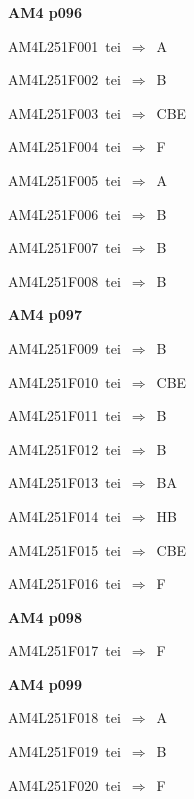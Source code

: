 \par\vfill\eject
{\bf\hfill AM4 p096\hfill\hbox{}}\par\bigskip
{\sixrm AM4L251F001\ {\sixit tei}\ }$\Rightarrow$\ A\par\smallskip
{\sixrm AM4L251F002\ {\sixit tei}\ }$\Rightarrow$\ B\par\smallskip
{\sixrm AM4L251F003\ {\sixit tei}\ }$\Rightarrow$\ CBE\par\smallskip
{\sixrm AM4L251F004\ {\sixit tei}\ }$\Rightarrow$\ F\par\smallskip
{\sixrm AM4L251F005\ {\sixit tei}\ }$\Rightarrow$\ A\par\smallskip
{\sixrm AM4L251F006\ {\sixit tei}\ }$\Rightarrow$\ B\par\smallskip
{\sixrm AM4L251F007\ {\sixit tei}\ }$\Rightarrow$\ B\par\smallskip
{\sixrm AM4L251F008\ {\sixit tei}\ }$\Rightarrow$\ B\par\smallskip

\par\vfill\eject
{\bf\hfill AM4 p097\hfill\hbox{}}\par\bigskip
{\sixrm AM4L251F009\ {\sixit tei}\ }$\Rightarrow$\ B\par\smallskip
{\sixrm AM4L251F010\ {\sixit tei}\ }$\Rightarrow$\ CBE\par\smallskip
{\sixrm AM4L251F011\ {\sixit tei}\ }$\Rightarrow$\ B\par\smallskip
{\sixrm AM4L251F012\ {\sixit tei}\ }$\Rightarrow$\ B\par\smallskip
{\sixrm AM4L251F013\ {\sixit tei}\ }$\Rightarrow$\ BA\par\smallskip
{\sixrm AM4L251F014\ {\sixit tei}\ }$\Rightarrow$\ HB\par\smallskip
{\sixrm AM4L251F015\ {\sixit tei}\ }$\Rightarrow$\ CBE\par\smallskip
{\sixrm AM4L251F016\ {\sixit tei}\ }$\Rightarrow$\ F\par\smallskip

\par\vfill\eject
{\bf\hfill AM4 p098\hfill\hbox{}}\par\bigskip
{\sixrm AM4L251F017\ {\sixit tei}\ }$\Rightarrow$\ F\par\smallskip

\par\vfill\eject
{\bf\hfill AM4 p099\hfill\hbox{}}\par\bigskip
{\sixrm AM4L251F018\ {\sixit tei}\ }$\Rightarrow$\ A\par\smallskip
{\sixrm AM4L251F019\ {\sixit tei}\ }$\Rightarrow$\ B\par\smallskip
{\sixrm AM4L251F020\ {\sixit tei}\ }$\Rightarrow$\ F\par\smallskip

